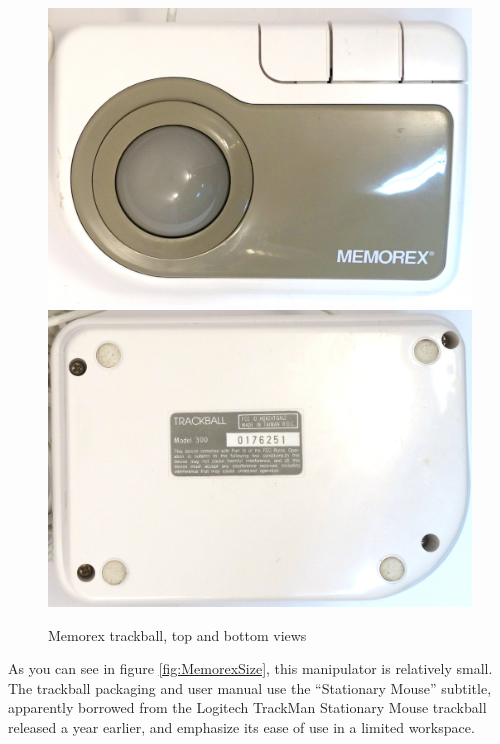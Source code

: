 \documentclass[11pt, a4paper]{article}
\begin{document}
\begin{figure}[h]
    \centering
    \includegraphics[scale=0.45]{1994_memorex_trackball/top_30.jpg}
    \includegraphics[scale=0.45]{1994_memorex_trackball/bottom_30.jpg}
    \caption{Memorex trackball, top and bottom views}
    \label{fig:MemorexTopBottom}
\end{figure}

As you can see in figure \ref{fig:MemorexSize}, this manipulator is relatively small.
The trackball packaging and user manual use the “Stationary Mouse” subtitle, apparently borrowed from the Logitech TrackMan Stationary Mouse trackball released a year earlier, and emphasize its ease of use in a limited workspace.
\end{document}

